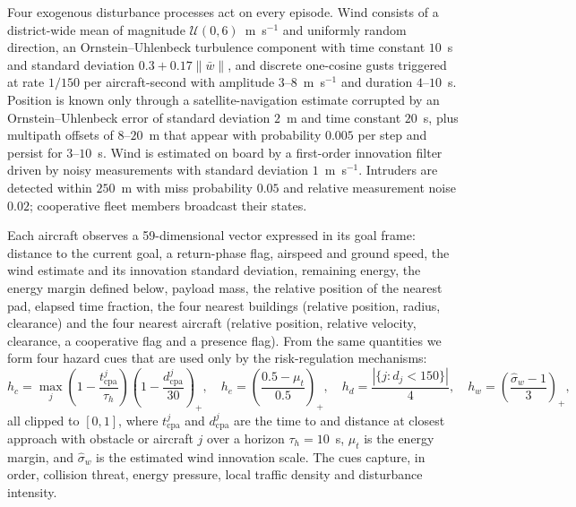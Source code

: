 Four exogenous disturbance processes act on every episode. Wind consists of a district-wide mean of magnitude $\mathcal{U}(0,6)$~m~s$^{-1}$ and uniformly random direction, an Ornstein--Uhlenbeck turbulence component with time constant $10$~s and standard deviation $0.3+0.17\lVert\bar w\rVert$, and discrete one-cosine gusts\cite{milhdbk1797} triggered at rate $1/150$ per aircraft-second with amplitude $3$--$8$~m~s$^{-1}$ and duration $4$--$10$~s. Position is known only through a satellite-navigation estimate corrupted by an Ornstein--Uhlenbeck error of standard deviation $2$~m and time constant $20$~s, plus multipath offsets of $8$--$20$~m that appear with probability $0.005$ per step and persist for $3$--$10$~s\cite{zhu2018gnss}. Wind is estimated on board by a first-order innovation filter driven by noisy measurements with standard deviation $1$~m~s$^{-1}$. Intruders are detected within $250$~m with miss probability $0.05$ and relative measurement noise $0.02$; cooperative fleet members broadcast their states.

Each aircraft observes a 59-dimensional vector expressed in its goal frame: distance to the current goal, a return-phase flag, airspeed and ground speed, the wind estimate and its innovation standard deviation, remaining energy, the energy margin defined below, payload mass, the relative position of the nearest pad, elapsed time fraction, the four nearest buildings (relative position, radius, clearance) and the four nearest aircraft (relative position, relative velocity, clearance, a cooperative flag and a presence flag). From the same quantities we form four hazard cues that are used only by the risk-regulation mechanisms:
\begin{equation}
h_c = \max_j \left(1-\frac{t^j_{\mathrm{cpa}}}{\tau_h}\right)\left(1-\frac{d^j_{\mathrm{cpa}}}{30}\right)_{\!+}\!\!, \quad
h_e = \left(\frac{0.5-\mu_t}{0.5}\right)_{\!+}\!\!, \quad
h_d = \frac{|\{j: d_j<150\}|}{4}, \quad
h_w = \left(\frac{\hat\sigma_w-1}{3}\right)_{\!+}\!\!,
\label{eq:cues}
\end{equation}
all clipped to $[0,1]$, where $t^j_{\mathrm{cpa}}$ and $d^j_{\mathrm{cpa}}$ are the time to and distance at closest approach with obstacle or aircraft $j$ over a horizon $\tau_h=10$~s, $\mu_t$ is the energy margin, and $\hat\sigma_w$ is the estimated wind innovation scale. The cues capture, in order, collision threat, energy pressure, local traffic density and disturbance intensity.

